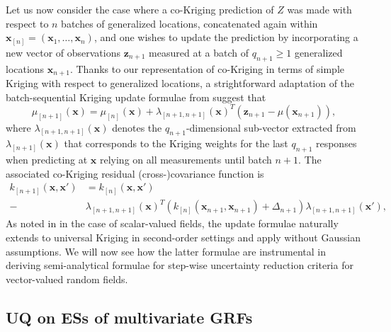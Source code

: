 \documentclass[aoas]{imsart}
\begin{document}
Let us now consider the case where a co-Kriging prediction of $Z$ was
made with respect to $n$ batches of generalized locations, concatenated again within $\bm{x}_{[n]}=(\bm{x}_1,\dots, \bm{x}_n)$,
and one wishes to update the prediction by incorporating a new vector
of observations $\mathbf{z}_{n+1}$ measured at a batch of
$q_{n+1} \geq 1$ generalized locations $\bm{x}_{n+1}$.
Thanks to our representation of co-Kriging in terms of simple Kriging
with respect to generalized locations, a strightforward adaptation of
the batch-sequential Kriging update formulae from
\cite{Chevalier.etal2013a} suggest that
% 
\begin{equation}\label{eq:meanCoK}
\mu_{[n+1]}(\bm{x})=\mu_{[n]}(\bm{x})+\lambda_{[n+1,n+1]}(\bm{x})^T (\mathbf{z}_{n+1}-\mu(\bm{x}_{n+1})),
\end{equation}
where $\lambda_{[n+1,n+1]}(\bm{x})$ denotes the $q_{n+1}$-dimensional
sub-vector extracted from $\lambda_{[n+1]}(\bm{x})$ that corresponds
to the Kriging weights for the last $q_{n+1}$ responses
when predicting at $\bm{x}$ relying on all measurements until batch $n+1$.
The associated co-Kriging residual (cross-)covariance function is
\begin{align}\label{eq:varCoK}
k_{[n+1]}(\bm{x},\bm{x}') & = k_{[n]}(\bm{x},\bm{x}')\\
 \nonumber - & \lambda_{[n+1,n+1]}(\bm{x})^T 
\left(k_{[n]}(\bm{x}_{n+1}, \bm{x}_{n+1})+\Delta_{n+1}\right)
\lambda_{{[n+1,n+1]}}(\bm{x}'),
\end{align}
%
As noted in \cite{Chevalier2015} in the case of scalar-valued fields,
the update formulae naturally extends to universal Kriging in
second-order settings and apply without Gaussian assumptions. We will
now see how the latter formulae are instrumental in deriving
semi-analytical formulae for step-wise uncertainty reduction criteria
for vector-valued random fields.

\subsection{UQ on ESs of multivariate GRFs}
\label{sec:set_uq}
\end{document}

